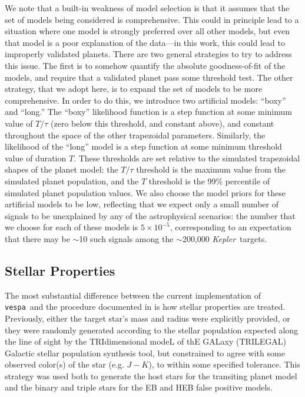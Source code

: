 \documentclass{emulateapj}
\newcommand{\sectlabel}[1]{\label{sect:#1}}
\newcommand{\kepler}{\textit{Kepler}}
\newcommand{\vespa}{\texttt{vespa}}
\begin{document}
We note that a built-in weakness of model selection is that it assumes that
the set of models being considered is comprehensive.  This could
in principle lead to a situation where one model is strongly preferred
over all other models, but even that model is a poor explanation of
the data---in this work, this could lead to improperly validated planets.  
There are two general strategies to try to address this issue.  The first 
is to somehow quantify the absolute goodness-of-fit of the models, and 
require that a validated planet pass some threshold test.  The other 
strategy, that we adopt here, is to expand the set of models to be more 
comprehensive.  In order to do this, we introduce two artificial models:
``boxy'' and ``long.''  The ``boxy'' likelihood function is a step function
at some minimum value of $T/\tau$ (zero below this threshold, and constant
above), and constant throughout the space of the other trapezoidal parameters.
Similarly, the likelihood of the ``long'' model is a step function at some
minimum threshold value of duration $T$.  These thresholds  
are set relative to the simulated trapezoidal shapes of the planet model:
the $T/\tau$ threshold is the maximum value from the simulated planet population,
and the $T$ threshold is the 99\% percentile of simulated planet
population values.  We also choose the model priors for these artificial
models to be low, reflecting that we expect only a small number of signals
to be unexplained by any of the astrophysical scenarios: the number that we
choose for each of these models is $5 \times 10^{-5}$, corresponding to an expectation
that there may be $\sim$10 such signals among the $\sim$200,000 \kepler\ targets.


\subsection{Stellar Properties}
\sectlabel{methods:stellar}

The most substantial difference between the current implementation of
\vespa\ and the procedure documented in  is
how stellar properties are treated.  Previously, either the target
star's mass and radius were explicitly provided, or they were randomly
generated according to the stellar population expected along the line
of sight by the TRIdimensional modeL of thE GALaxy (TRILEGAL) Galactic
stellar population synthesis tool, but constrained to agree with some
observed color(s) of the star (e.g. $J-K$), to within some specified
tolerance.  This strategy was used both to generate the host stars for
the transiting planet model and the binary and triple stars for the EB
and HEB false positive models.
\end{document}
